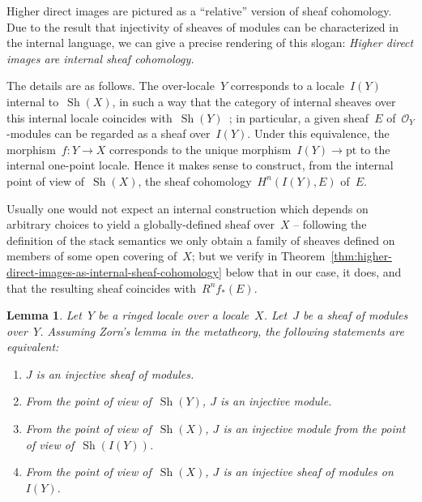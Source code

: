 \documentclass[oneside]{amsart}
\theoremstyle{definition}
\theoremstyle{plain}
\newtheorem{lemma}[defn]{Lemma}
\theoremstyle{remark}
\renewcommand{\O}{\mathcal{O}}
\DeclareMathOperator{\Sh}{Sh}
\renewcommand{\_}{\mathpunct{.}\,}
\begin{document}
Higher direct images are pictured as a ``relative'' version of sheaf
cohomology. Due to the result that injectivity of sheaves of modules can be
characterized in the internal language, we can give a precise
rendering of this slogan: \emph{Higher direct images are
internal sheaf cohomology.}

The details are as follows. The over-locale~$Y$ corresponds to a locale~$I(Y)$ internal to~$\Sh(X)$, in
such a way that the category of internal sheaves over this internal locale
coincides with~$\Sh(Y)$~\cite[Scholium~C1.6.4]{johnstone:elephant}; in particular, a given sheaf~$E$ of~$\O_Y$-modules can
be regarded as a sheaf over~$I(Y)$. Under this equivalence, the morphism~$f : Y
\to X$ corresponds to the unique morphism~$I(Y) \to \mathrm{pt}$ to the
internal one-point locale. Hence it makes sense to construct, from the internal
point of view of~$\Sh(X)$, the sheaf cohomology~$H^n(I(Y), E)$ of~$E$.

Usually one would not expect an internal construction which depends on
arbitrary choices to yield a globally-defined sheaf over~$X$ -- following the
definition of the stack semantics we only obtain a family of sheaves defined on
members of some open covering of~$X$; but we verify in
Theorem~\ref{thm:higher-direct-images-as-internal-sheaf-cohomology} below that in our
case, it does, and that the resulting sheaf coincides with~$R^n f_*(E)$.

\begin{lemma}\label{lemma:notions-of-internal-injectivity}
Let~$Y$ be a ringed locale over a locale~$X$. Let~$J$ be a sheaf of modules over~$Y$.
Assuming Zorn's lemma in the metatheory, the following statements are equivalent:
\begin{enumerate}
\item $J$ is an injective sheaf of modules.
\item From the point of view of~$\Sh(Y)$, $J$ is an injective module.
\item From the point of view of~$\Sh(X)$, $J$ is an injective module from the
point of view of~$\Sh(I(Y))$.
\item From the point of view of~$\Sh(X)$, $J$ is an injective sheaf of modules
on~$I(Y)$.
\end{enumerate}
\end{lemma}
\end{document}
